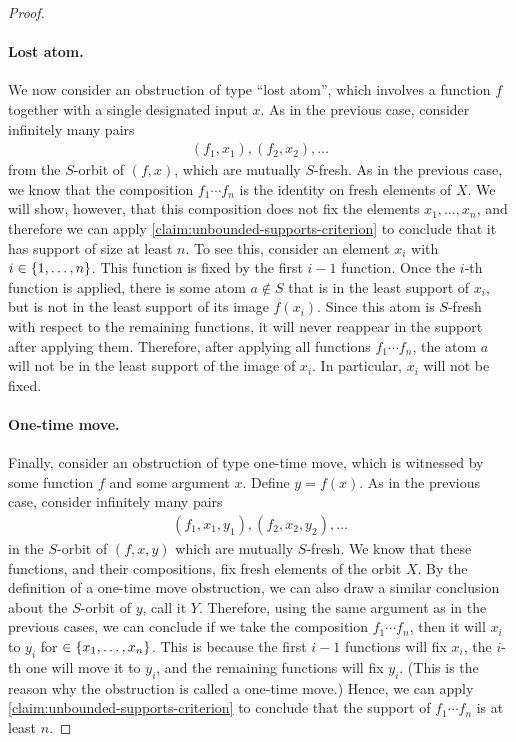\begin{proof}
\paragraph*{Lost atom.} We now consider an obstruction of type ``lost atom'', which involves a function $f$ together with a single designated input $x$. As in the previous case, consider infinitely many pairs 
\begin{align*}
(f_1,x_1),(f_2,x_2), \ldots 
\end{align*}
from the $S$-orbit of $(f,x)$, which are mutually $S$-fresh. As in the previous case, we know that the composition $f_1 \cdots f_n$ is the identity on fresh elements of $X$. We will show, however, that this composition does not fix the elements $x_1,\ldots,x_n$, and therefore we can apply \cref{claim:unbounded-supports-criterion} to conclude that it has support of size at least $n$. To see this, consider an element $x_i$ with $i \in \{1,\ldots,n\}$. This function is fixed by the first $i-1$ function. Once the $i$-th function is applied, there is some atom $a \not \in S$ that is in the least  support of $x_i$, but is not in the least support of its image $f(x_i)$. Since this atom is $S$-fresh with respect to the remaining functions, it will never reappear in the support after applying them. Therefore, after applying all functions $f_1 \cdots f_n$, the atom $a$ will not be in the least support of the image of $x_i$. In particular, $x_i$ will not be fixed.

\paragraph*{One-time move.} Finally, consider an obstruction of type one-time move, which is witnessed by some function $f$ and some argument $x$. Define $y = f(x)$. As in the previous case, consider infinitely many pairs 
\begin{align*}
(f_1,x_1,y_1),(f_2,x_2,y_2), \ldots 
\end{align*}
in the $S$-orbit of $(f,x,y)$ which are mutually $S$-fresh. 
We know that these functions, and their compositions, fix fresh elements of the orbit $X$. By the definition of a one-time move obstruction, we can also draw a similar conclusion about the $S$-orbit of $y$, call it $Y$. Therefore, using the same argument as in the previous cases, we can conclude if we take the composition $f_1 \cdots f_n$, then it will $x_i$ to $y_i$ for $ \in \{x_1,\ldots,x_n\}$. This is because the first $i-1$ functions will fix $x_i$, the $i$-th one will move it to $y_i$, and the remaining functions will fix $y_i$. (This is the reason why the obstruction is called a one-time move.) Hence, we can apply \cref{claim:unbounded-supports-criterion} to conclude that the support of $f_1 \cdots f_n$ is at least $n$.
\end{proof}

